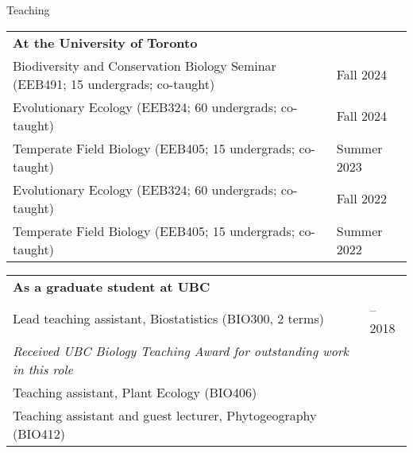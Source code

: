 \documentclass[letterpaper,11pt,oneside]{article}
\begin{document}


\newpage




\noindent\Large{Teaching}
\normalsize
\medskip

\def\arraystretch{1.1}
\noindent \begin{tabular}{@{} >{\raggedright\arraybackslash}p{14.7cm} >{\raggedleft\arraybackslash}p{2.5cm}}
 \textbf{At the University of Toronto} & \\
 Biodiversity and Conservation Biology Seminar (EEB491; 15 undergrads; co-taught) & Fall 2024\\ 
 Evolutionary Ecology (EEB324; 60 undergrads; co-taught) & Fall 2024\\ 
 Temperate Field Biology (EEB405; 15 undergrads; co-taught) & Summer 2023\\ 
 Evolutionary Ecology (EEB324; 60 undergrads; co-taught) & Fall 2022\\ 
 Temperate Field Biology (EEB405; 15 undergrads; co-taught) & Summer 2022\\ 
\end{tabular}
\noindent \begin{tabular}{@{} >{\raggedright\arraybackslash}p{15.5cm} >{\raggedright\arraybackslash}p{1.7cm}}
 
 \textbf{As a graduate student at UBC} & \\
 Lead teaching assistant, Biostatistics (BIO300, 2 terms) & 2017--2018 \\
  \hspace{5mm}\textit{Received UBC Biology Teaching Award for outstanding work in this role} &  \\
 Teaching assistant, Plant Ecology (BIO406) & 2017 \\
 Teaching assistant and guest lecturer, Phytogeography (BIO412) & 2016 \\ 
\end{tabular}
\bigskip
\end{document}
